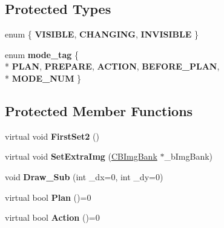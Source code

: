 \subsection*{Protected Types}
\begin{DoxyCompactItemize}
\item 
enum \{ {\bfseries V\+I\+S\+I\+B\+LE}, 
{\bfseries C\+H\+A\+N\+G\+I\+NG}, 
{\bfseries I\+N\+V\+I\+S\+I\+B\+LE}
 \}\hypertarget{class_c_actor_a72cc31c27f3d300119c0dae98d01eab7}{}\label{class_c_actor_a72cc31c27f3d300119c0dae98d01eab7}

\item 
enum {\bfseries mode\+\_\+tag} \{ \\*
{\bfseries P\+L\+AN}, 
{\bfseries P\+R\+E\+P\+A\+RE}, 
{\bfseries A\+C\+T\+I\+ON}, 
{\bfseries B\+E\+F\+O\+R\+E\+\_\+\+P\+L\+AN}, 
\\*
{\bfseries M\+O\+D\+E\+\_\+\+N\+UM}
 \}\hypertarget{class_c_actor_a6862dea3af171b967810ee5619738939}{}\label{class_c_actor_a6862dea3af171b967810ee5619738939}

\end{DoxyCompactItemize}
\subsection*{Protected Member Functions}
\begin{DoxyCompactItemize}
\item 
virtual void {\bfseries First\+Set2} ()\hypertarget{class_c_actor_aa7ccf97658107cd329f0dd669ce860ee}{}\label{class_c_actor_aa7ccf97658107cd329f0dd669ce860ee}

\item 
virtual void {\bfseries Set\+Extra\+Img} (\hyperlink{class_c_b_img_bank}{C\+B\+Img\+Bank} $\ast$\+\_\+b\+Img\+Bank)\hypertarget{class_c_actor_a113ab38eefb563c9bac95ed6766e7753}{}\label{class_c_actor_a113ab38eefb563c9bac95ed6766e7753}

\item 
void {\bfseries Draw\+\_\+\+Sub} (int \+\_\+dx=0, int \+\_\+dy=0)\hypertarget{class_c_actor_a0e23ae6d89e19d1f97c911c3a2979f83}{}\label{class_c_actor_a0e23ae6d89e19d1f97c911c3a2979f83}

\item 
virtual bool {\bfseries Plan} ()=0\hypertarget{class_c_actor_a5d3981af7c89ec304ee42edf0dc4d5e6}{}\label{class_c_actor_a5d3981af7c89ec304ee42edf0dc4d5e6}

\item 
virtual bool {\bfseries Action} ()=0\hypertarget{class_c_actor_a8488f83306f1bb4dde2144438f3b05c0}{}\label{class_c_actor_a8488f83306f1bb4dde2144438f3b05c0}

\end{DoxyCompactItemize}
